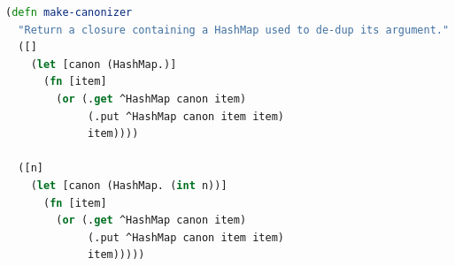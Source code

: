 \documentclass[10pt,openany]{article}
\numberwithin{definition}{section}
\numberwithin{example}{section}
\numberwithin{equation}{section}
\numberwithin{figure}{section}
\begin{document}
\begin{minipage}[t]{1\columnwidth}%
\begin{lstlisting}[caption={Canonizer factory },label={lis:canonizer-factory},language=clojure,tabsize=2]
(defn make-canonizer
  "Return a closure containing a HashMap used to de-dup its argument."
  ([]       
    (let [canon (HashMap.)]
      (fn [item]
        (or (.get ^HashMap canon item)
             (.put ^HashMap canon item item)
             item))))

  ([n]
    (let [canon (HashMap. (int n))]
      (fn [item]
        (or (.get ^HashMap canon item)
             (.put ^HashMap canon item item)
             item)))))
\end{lstlisting}
%
\end{minipage}

\newpage{}


\end{document}
